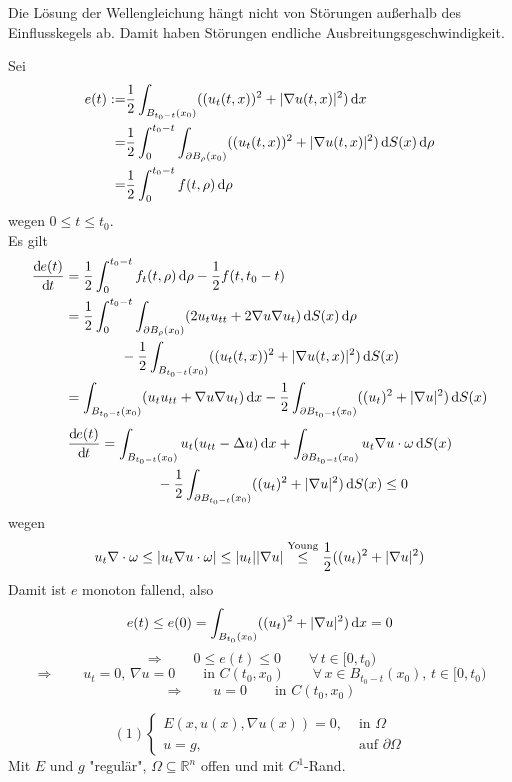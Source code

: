 \begin{bemerkung}
	Die Lösung der Wellengleichung hängt nicht von Störungen außerhalb des Einflusskegels ab. Damit haben Störungen endliche Ausbreitungsgeschwindigkeit.
\end{bemerkung}
\begin{beweis}
	Sei
	\begin{align*}
		e(t) :=& \frac{1}{2} \int_{B_{t_0-t}(x_0)}^{} ((u_t(t,x))^2 + \lvert \nabla  u(t,x)\rvert^2) \,\mathrm{d}x \\
		=& \frac{1}{2} \int_{0}^{t_0-t} \int_{\partial B_{\rho}(x_0)}^{} ((u_t(t,x))^2 + \lvert \nabla u(t,x)\rvert^2) \,\mathrm{d}S(x) \,\mathrm{d} \rho \\
		=& \frac{1}{2} \int_{0}^{t_0-t} f(t,\rho) \,\mathrm{d}\rho
	\end{align*}
	wegen $0 \leq t \leq t_0$. \\
	Es gilt
	\begin{align*}
		\frac{\mathrm{d}\mkern-1.0mu e(t)}{\mathrm{d}\mkern-1.0mu t}  &= \frac{1}{2} \int_{0}^{t_0-t} f_t(t,\rho)  \,\mathrm{d}\rho - \frac{1}{2}f(t,t_0-t) \\
		&= \frac{1}{2} \int_{0}^{t_0-t} \int_{\partial B_\rho(x_0)}^{} ( 2 u_t u_{tt} + 2  \nabla u  \nabla u_t) \,\mathrm{d}S(x) \,\mathrm{d}\rho \\
		& \qquad \qquad - \frac{1}{2}\int_{B_{t_0-t}(x_0)}^{}((u_t(t,x))^2 + \lvert \nabla u(t,x)\rvert^2) \,\mathrm{d}S(x) \\
		&= \int_{B_{t_0-t}(x_0)}^{}(u_t u_{tt}+  \nabla u  \nabla u_t) \,\mathrm{d}x - \frac{1}{2} \int_{\partial B_{t_0-t}(x_0)}^{} 
		((u_t)^2 + \lvert \nabla u\rvert^2) \,\mathrm{d}S(x)
	\end{align*}
	\begin{align*}
		\frac{\mathrm{d}\mkern-1.0mu e(t)}{\mathrm{d}\mkern-1.0mu t}  &= \int_{B_{t_0-t}(x_0)}^{} u_t( u_{tt}- \Delta u) \,\mathrm{d}x + \int_{\partial B_{t_0-t}(x_0)}^{} u_t  \nabla u \cdot \omega
		 \,\mathrm{d}S(x) \\ & \qquad \qquad - \frac{1}{2} \int_{\partial B_{t_0-t}(x_0)}^{}((u_t)^2 + \lvert  \nabla u\rvert^2) \,\mathrm{d}S(x) \leq 0
	\end{align*}
	wegen
	\[
		u_t  \nabla \cdot \omega \leq \lvert u_t  \nabla u \cdot \omega\rvert \leq \lvert u_t\rvert\lvert \nabla u\rvert \stackrel{\text{Young}}{\leq } \frac{1}{2} ((u_t)^2 + \lvert \nabla u\rvert^2)
	\]
	Damit ist $e$ monoton fallend, also 
	\[
		e(t) \leq e(0) = \int_{B_{t_0}(x_0)}^{} ((u_t)^2 + \lvert \nabla u\rvert^2) \,\mathrm{d}x =0
	\]
	\[
		\Rightarrow \qquad 0 \leq  e(t) \leq 0 \qquad \forall\, t \in [0,t_0)
	\]
	\[
		\Rightarrow \qquad u_t=0, \, \nabla u=0 \qquad \text{in } C(t_0,x_0) \qquad \forall\, x \in B_{t_0-t}(x_0), \,t \in [0,t_0)
	\]
	\[
		\Rightarrow \qquad u=0 \qquad \text{in }C(t_0,x_0)
	\]
\end{beweis}
\[
	(1) \begin{cases}
		E(x,u(x), \nabla u(x))=0, &\text{ in }\Omega\\
		u=g,&\text{ auf }\partial \Omega
	\end{cases}
\]
Mit $E$ und $g$ "regulär", $\Omega \subseteq \mathbb{R}^n$ offen und mit $C^1$-Rand.
\newpage
